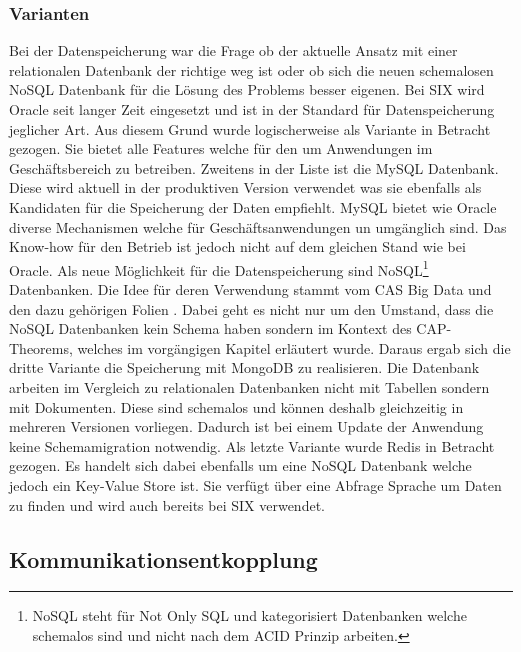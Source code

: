 \subsubsection{Varianten}
Bei der Datenspeicherung war die Frage ob der aktuelle Ansatz mit einer relationalen Datenbank der richtige weg ist oder ob sich die neuen schemalosen NoSQL Datenbank für die Lösung des Problems besser eigenen.\newline
Bei SIX wird Oracle seit langer Zeit eingesetzt und ist in der Standard für Datenspeicherung jeglicher Art. Aus diesem Grund wurde logischerweise als Variante in Betracht gezogen. Sie bietet alle Features welche für den um Anwendungen im Geschäftsbereich zu betreiben.\newline
Zweitens in der Liste ist die MySQL Datenbank. Diese wird aktuell in der produktiven Version verwendet was sie ebenfalls als Kandidaten für die Speicherung der Daten empfiehlt.
MySQL bietet wie Oracle diverse Mechanismen welche für Geschäftsanwendungen un umgänglich sind. Das Know-how für den Betrieb ist jedoch nicht auf dem gleichen Stand wie bei Oracle.\newline
Als neue Möglichkeit für die Datenspeicherung sind NoSQL\footnote{NoSQL steht für Not Only SQL und kategorisiert Datenbanken welche schemalos sind und nicht nach dem ACID Prinzip arbeiten.} Datenbanken. Die Idee für deren Verwendung stammt vom CAS Big Data und den dazu gehörigen Folien \cite{nosqlintro}. Dabei geht es nicht nur um den Umstand, dass die NoSQL Datenbanken kein Schema haben sondern im Kontext des CAP-Theorems, welches im vorgängigen Kapitel erläutert wurde. 
Daraus ergab sich die dritte Variante die Speicherung mit MongoDB zu realisieren. Die Datenbank arbeiten im Vergleich zu relationalen Datenbanken nicht mit Tabellen sondern mit Dokumenten. Diese sind schemalos und können deshalb gleichzeitig in mehreren Versionen vorliegen. Dadurch ist bei einem Update der Anwendung keine Schemamigration notwendig.\newline
Als letzte Variante wurde Redis in Betracht gezogen. Es handelt sich dabei ebenfalls um eine NoSQL Datenbank welche jedoch ein Key-Value Store ist. Sie verfügt über eine Abfrage Sprache um Daten zu finden und wird auch bereits bei SIX verwendet.

\subsection{Kommunikationsentkopplung}

